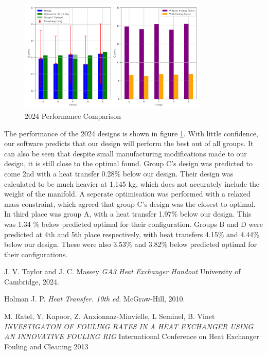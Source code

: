 \documentclass{article}
\begin{document}
\begin{figure}[H]
    \centering
    \includegraphics[width=0.8\textwidth]{2024comparison.png}
    \caption{2024 Performance Comparison}
    \label{fig:2024_performance}
\end{figure}

The performance of the 2024 designs is shown in figure \ref{fig:2024_performance}.
With little confidence, our software predicts that our design will perform the best out of all groups.
It can also be seen that despite small manufacturing modifications made to our design, it is still close to the optimal found.
Group C's design was predicted to come 2nd with a heat transfer 0.28\% below our design.
Their design was calculated to be much heavier at 1.145 kg, which does not accurately include the weight of the manifold.
A seperate optimisation was performed with a relaxed mass constraint, which agreed that group C's design was the closest to optimal.
In third place was group A, with a heat transfer 1.97\% below our design. This was 1.34 \% below predicted optimal for their configuration.
Groups B and D were predicted at 4th and 5th place respectively, with heat transfers 4.15\% and 4.44\% below our design.
These were also 3.53\% and 3.82\% below predicted optimal for their configurations.

\begin{thebibliography}{9}

    
      J. V. Taylor and J. C. Massey
      \emph{GA3 Heat Exchanger Handout}
      University of Cambridge,
      2024.
    
      Holman J. P.
      \emph{Heat Transfer. 10th ed.}
      McGraw-Hill,
      2010.

      M. Ratel, Y. Kapoor, Z. Anxionnaz-Minvielle, L Seminel, B. Vinet
      \emph{INVESTIGATON OF FOULING RATES IN A HEAT EXCHANGER USING AN INNOVATIVE FOULING RIG}
      International Conference on Heat Exchanger Fouling and Cleaning
      2013

\end{thebibliography}
\end{document}
